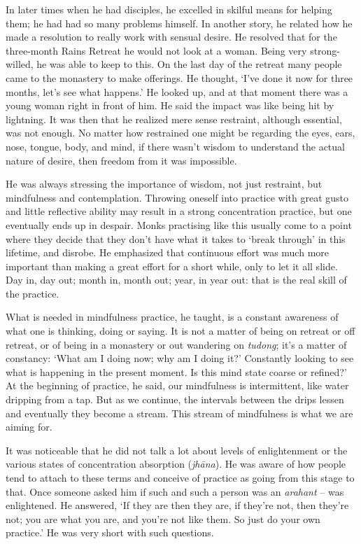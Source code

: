 In later times when he had disciples, he excelled in skilful means for
helping them; he had had so many problems himself. In another story, he
related how he made a resolution to really work with sensual desire. He
resolved that for the three-month Rains Retreat he would not look at a
woman. Being very strong-willed, he was able to keep to this. On the
last day of the retreat many people came to the monastery to make
offerings. He thought, `I've done it now for three months, let's see
what happens.' He looked up, and at that moment there was a young woman
right in front of him. He said the impact was like being hit by
lightning. It was then that he realized mere sense restraint, although
essential, was not enough. No matter how restrained one might be regarding
the eyes, ears, nose, tongue, body, and mind, if there wasn't wisdom to
understand the actual nature of desire, then freedom from it was
impossible.

He was always stressing the importance of wisdom, not just restraint, 
but mindfulness and contemplation. Throwing oneself into practice with
great gusto and little reflective ability may result in a strong
concentration practice, but one eventually ends up in despair. Monks
practising like this usually come to a point where they decide that they
don't have what it takes to `break through' in this lifetime, and
disrobe. He emphasized that continuous effort was much more important
than making a great effort for a short while, only to let it all slide. 
Day in, day out; month in, month out; year, in year out: that is the
real skill of the practice. 

What is needed in mindfulness practice, he taught, is a constant
awareness of what one is thinking, doing or saying. It is not a matter
of being on retreat or off retreat, or of being in a monastery or out
wandering on \emph{tudong}; it's a matter of constancy: `What am I doing
now; why am I doing it?' Constantly looking to see what is happening in
the present moment. Is this mind state coarse or refined?' At the
beginning of practice, he said, our mindfulness is intermittent, like
water dripping from a tap. But as we continue, the intervals between the
drips lessen and eventually they become a stream. This stream of
mindfulness is what we are aiming for. 

It was noticeable that he did not talk a lot about levels of
enlightenment or the various states of concentration absorption
 (\emph{jhāna}). He was aware of how people tend to attach to these terms
and conceive of practice as going from this stage to that. Once someone
asked him if such and such a person was an \emph{arahant} -- was
enlightened. He answered, `If they are then they are, if they're not, 
then they're not; you are what you are, and you're not like them. So
just do your own practice.' He was very short with such questions. 

